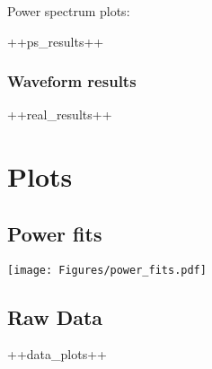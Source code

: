Power spectrum plots:

++ps_results++


\subsubsection{Waveform results}

++real_results++

\section{Plots}

\subsection*{Power fits}
\texttt{[image: Figures/power\_fits.pdf]}   

\subsection*{Raw Data}
++data_plots++